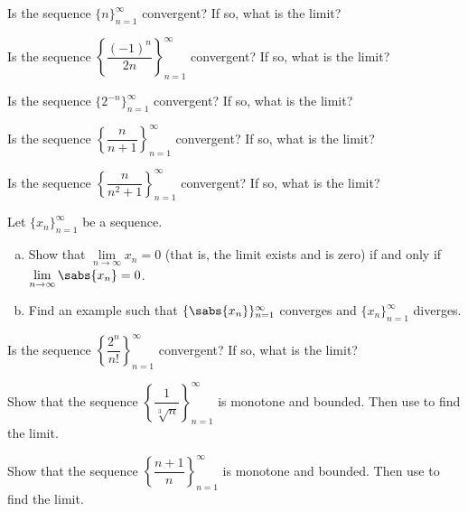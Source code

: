 \begin{exercise}
Is the sequence
$\{ n \}_{n=1}^\infty$
convergent?  If so, what is the limit?
\end{exercise}

\begin{exercise}
Is the sequence
$\left\{ \dfrac{{(-1)}^n}{2n} \right\}_{n=1}^\infty$
convergent?  If so, what is the limit?
\end{exercise}

\begin{exercise}
Is the sequence
$\{ 2^{-n} \}_{n=1}^\infty$
convergent?  If so, what is the limit?
\end{exercise}

\begin{exercise}
Is the sequence
$\left\{ \dfrac{n}{n+1} \right\}_{n=1}^\infty$
convergent?  If so, what is the limit?
\end{exercise}

\begin{exercise}
Is the sequence
$\left\{ \dfrac{n}{n^2+1} \right\}_{n=1}^\infty$
convergent?  If so, what is the limit?
\end{exercise}

\begin{exercise} \label{exercise:absconv}
Let $\{ x_n \}_{n=1}^\infty$ be a sequence.
\begin{enumerate}[a)]
\item Show that $\lim\limits_{n\to\infty} x_n = 0$ (that is, the limit exists and is zero)
if and only if $\lim\limits_{n\to\infty} \sabs{x_n} = 0$.
\item Find an example such that $\{ \sabs{x_n} \}_{n=1}^\infty$ converges and
$\{ x_n \}_{n=1}^\infty$
diverges.
\end{enumerate}
\end{exercise}

\begin{exercise}
Is the sequence
$\left\{ \dfrac{2^n}{n!} \right\}_{n=1}^\infty$
convergent?  If so, what is the limit?
\end{exercise}

\begin{exercise}
Show that the sequence
$\left\{ \dfrac{1}{\sqrt[3]{n}} \right\}_{n=1}^\infty$ is monotone and bounded.  Then use
 to find the limit.
\end{exercise}

\begin{exercise}
Show that the sequence
$\left\{ \dfrac{n+1}{n} \right\}_{n=1}^\infty$
is monotone and bounded.  Then use
 to find the limit.
\end{exercise}


